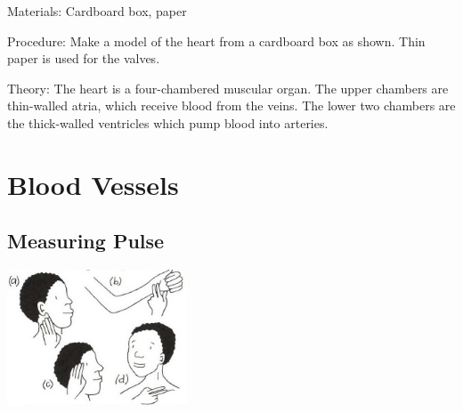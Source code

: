 \begin{multicols}{2}
\begin{description*}
\item[Materials:]{Cardboard box, paper}
\item[Procedure:]{Make a model of the heart from a
cardboard box as shown. Thin
paper is used for the valves.}
\item[Theory:]{The heart is a four-chambered muscular organ. The upper chambers are thin-walled atria,
which receive blood from the veins. The lower two chambers are the thick-walled ventricles
which pump blood into arteries.}
\end{description*}


\section*{Blood Vessels}


\subsection{Measuring Pulse} %

\begin{center}
\includegraphics[width=0.4\textwidth]{./img/vso/measuring-pulse.jpg}
\end{center}


\end{multicols}
